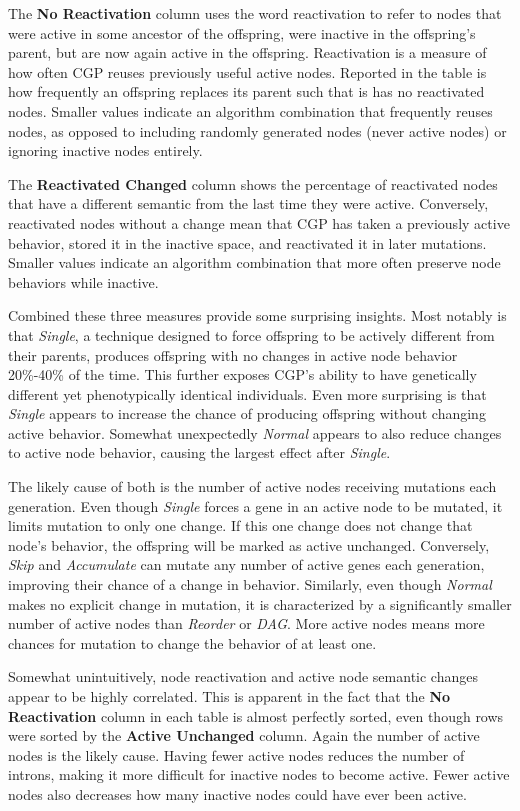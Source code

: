 \documentclass[journal]{IEEEtran}
\begin{document}
The \textbf{No Reactivation} column uses the word reactivation to refer to nodes
that were active in some ancestor of the offspring, were inactive in the offspring's
parent, but are now again active in the offspring.  Reactivation is a measure of how
often CGP reuses previously useful active nodes.  Reported in the table is how
frequently an offspring replaces its parent such that is has no reactivated nodes.  Smaller
values indicate an algorithm combination that frequently reuses nodes, as opposed to
including randomly generated nodes (never active nodes) or ignoring inactive nodes
entirely.

The \textbf{Reactivated Changed} column shows the percentage of reactivated nodes
that have a different semantic from the last time they were active.  Conversely,
reactivated nodes without a change mean that CGP has taken a previously active behavior,
stored it in the inactive space, and reactivated it in later mutations.  Smaller values
indicate an algorithm combination that more often preserve node behaviors while
inactive.

Combined these three measures provide some surprising insights.  Most notably
is that \emph{Single}, a technique designed to force offspring to be actively different
from their parents, produces offspring with no changes in active node behavior
20\%-40\% of the time.  This further exposes CGP's ability to have genetically different
yet phenotypically identical individuals.  Even more surprising is that \emph{Single}
appears to increase the chance of producing offspring without changing active behavior.
Somewhat unexpectedly \emph{Normal} appears to also reduce changes to active node behavior,
causing the largest effect after \emph{Single}.

The likely cause of both is the number
of active nodes receiving mutations each generation.  Even though \emph{Single}
forces a gene in an active node to be mutated, it limits mutation to only one change.
If this one change does not change that node's behavior, the offspring will be marked
as active unchanged.  Conversely, \emph{Skip} and \emph{Accumulate} can mutate any
number of active genes each generation, improving their chance of a change in behavior.
Similarly, even though \emph{Normal} makes no explicit change in mutation, it is characterized
by a significantly smaller number of active nodes than \emph{Reorder} or \emph{DAG}.  More
active nodes means more chances for mutation to change the behavior of at least one.

Somewhat unintuitively, node reactivation and active node semantic changes appear
to be highly correlated.  This is apparent in the fact that the \textbf{No Reactivation}
column in each table is almost perfectly sorted, even though rows were sorted by the
\textbf{Active Unchanged} column.  Again the number of active nodes is the likely
cause.  Having fewer active nodes reduces the number of introns, making it more
difficult for inactive nodes to become active.  Fewer active nodes also decreases
how many inactive nodes could have ever been active.
\end{document}

